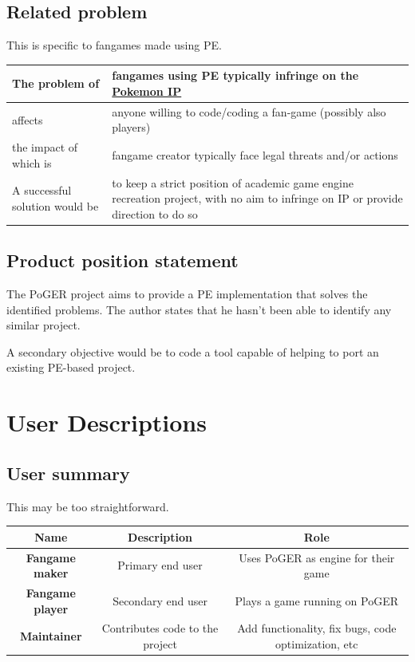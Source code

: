 \documentclass[11pt]{article}
\begin{document}
\subsection{Related problem}

This is specific to fangames made using PE.

\begin{tabular}{|a|L{.66\linewidth}|}
\hline
The problem of & fangames using PE typically infringe on the \href{https://www.pokemon.com/us/legal/}{Pokemon IP} \\
\hline
affects & anyone willing to code/coding a fan-game (possibly also players) \\
\hline
the impact of which is & fangame creator typically face legal threats and/or actions \\
\hline
A successful solution would be & to keep a strict position of academic game engine recreation project, with no aim to infringe on IP or provide direction to do so \\
\hline
\end{tabular}



\subsection{Product position statement}

The PoGER project aims to provide a PE implementation that solves the identified problems. The author states that he hasn't been able to identify any similar project.

A secondary objective would be to code a tool capable of helping to port an existing PE-based project.






\newpage 
\section{User Descriptions}

\subsection{User summary}

This may be too straightforward.

\begin{center}
	\begin{tabular}{|C{0.2\hsize}|C{0.3\hsize}|C{0.36\hsize}|}
		\hline
		\textbf{Name} & \textbf{Description} & \textbf{Role}  \\
		\hline
		\textbf{Fangame maker} & Primary end user & Uses PoGER as engine for their game \\
		\hline
		\textbf{Fangame player} & Secondary end user & Plays a game running on PoGER \\
		\hline
		\textbf{Maintainer} & Contributes code to the project & Add functionality, fix bugs, code optimization, etc \\
		\hline
	\end{tabular}
\end{center}
\end{document}
